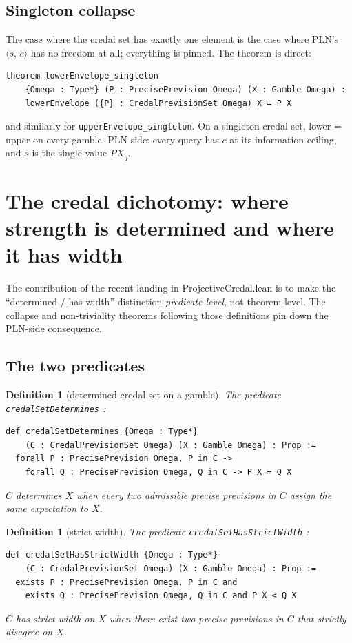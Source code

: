 \documentclass[]{article}
\newtheorem{definition}[theorem]{Definition}
\newcommand{\lid}[1]{{\ttfamily\nolinkurl{#1}}}
\newcommand{\STV}[2]{\langle #1,\, #2 \rangle}
\begin{document}
\subsection{Singleton collapse}

The case where the credal set has exactly one element is the case where
PLN's $\STV{s}{c}$ has no freedom at all; everything is pinned. The
theorem is direct:
\begin{lstlisting}
theorem lowerEnvelope_singleton
    {Omega : Type*} (P : PrecisePrevision Omega) (X : Gamble Omega) :
    lowerEnvelope ({P} : CredalPrevisionSet Omega) X = P X
\end{lstlisting}
and similarly for \lid{upperEnvelope\_singleton}. On a singleton credal
set, lower = upper on every gamble. PLN-side: every query has $c$ at its
information ceiling, and $s$ is the single value $P X_q$.

\section{The credal dichotomy: where strength is determined and where it has width}\label{sec:dichotomy}

The contribution of the recent landing in ProjectiveCredal.lean is to
make the ``determined / has width'' distinction \emph{predicate-level},
not theorem-level. The collapse and non-triviality theorems following
those definitions pin down the PLN-side consequence.

\subsection{The two predicates}

\begin{definition}[determined credal set on a gamble]\label{def:determines}
The predicate \lid{credalSetDetermines} :
\begin{lstlisting}
def credalSetDetermines {Omega : Type*}
    (C : CredalPrevisionSet Omega) (X : Gamble Omega) : Prop :=
  forall P : PrecisePrevision Omega, P in C ->
    forall Q : PrecisePrevision Omega, Q in C -> P X = Q X
\end{lstlisting}
$C$ \emph{determines} $X$ when every two admissible precise previsions in
$C$ assign the same expectation to $X$.
\end{definition}

\begin{definition}[strict width]\label{def:strictwidth}
The predicate \lid{credalSetHasStrictWidth} :
\begin{lstlisting}
def credalSetHasStrictWidth {Omega : Type*}
    (C : CredalPrevisionSet Omega) (X : Gamble Omega) : Prop :=
  exists P : PrecisePrevision Omega, P in C and
    exists Q : PrecisePrevision Omega, Q in C and P X < Q X
\end{lstlisting}
$C$ has \emph{strict width} on $X$ when there exist two precise previsions
in $C$ that strictly disagree on $X$.
\end{definition}
\end{document}
